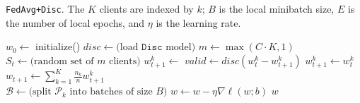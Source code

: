 \algrenewcommand\algorithmicfunction{}
\algrenewcommand\textproc{}
\begin{algorithm}[H]
\caption{\texttt{FedAvg+Disc}. The $K$ clients are indexed by $k$; $B$ is the local minibatch size, $E$ is the number of local epochs, and $\eta$ is the learning rate.}\label{alg:fedavg+disc}
\begin{algorithmic}[1]
    \State $w_0\leftarrow$ initialize()
    \State $disc\leftarrow \text{(load $\texttt{Disc}$ model)}$
        \State $m\leftarrow \max(C\cdot K, 1)$
        \State $S_t\leftarrow \text{(random set of $m$ clients)}$
            \State $w_{t+1}^k\leftarrow$ 
            \State $valid\leftarrow disc(w_t^k-w_{t+1}^k)$
                $w_{t+1}^k\leftarrow w_t^k$
            \EndIf
        \EndFor
        \State $w_{t+1}\leftarrow \sum_{k=1}^K\frac{n_k}{n}w_{t+1}^k$
    \EndFor
\EndFunction
\\
    \State $\mathcal{B}\leftarrow \text{(split $\mathcal{P}_k$ into batches of size $B$)}$
            \State $w\leftarrow w-\eta\nabla\ell(w;b)$
        \EndFor
    \EndFor
    \Return $w$
\EndFunction
\end{algorithmic}
\end{algorithm}


